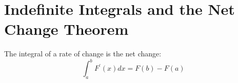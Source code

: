\section{Indefinite Integrals and the Net Change Theorem}
\begin{theorem}
	\label{net-change-theorem}
	The integral of a rate of change is the net change:
	\begin{equation}
	\int_{a}^{b} F^\prime\left( x \right) dx = F\left(b\right)-F\left(a\right)
	\end{equation}
\end{theorem}

\setcounter{problem}{20}

\setcounter{problem}{63}

